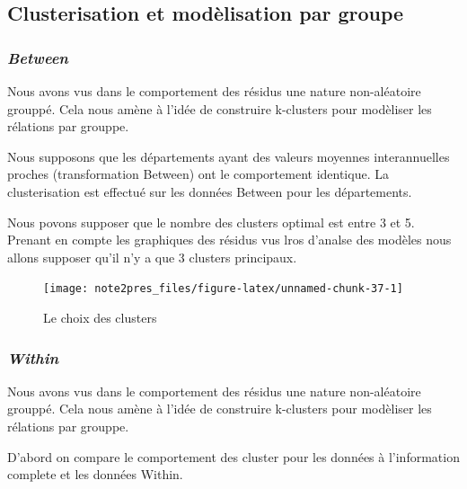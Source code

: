 \documentclass[11pt,]{article}
\begin{document}
\FloatBarrier

\hypertarget{clusterisation-et-modelisation-par-groupe}{%
\subsection{Clusterisation et modèlisation par
groupe}\label{clusterisation-et-modelisation-par-groupe}}

\hypertarget{between}{%
\subsubsection{\texorpdfstring{\emph{Between}}{Between}}\label{between}}

Nous avons vus dans le comportement des résidus une nature non-aléatoire
grouppé. Cela nous amène à l'idée de construire k-clusters pour
modèliser les rélations par grouppe.

Nous supposons que les départements ayant des valeurs moyennes
interannuelles proches (transformation Between) ont le comportement
identique. La clusterisation est effectué sur les données Between pour
les départements.

Nous povons supposer que le nombre des clusters optimal est entre 3 et
5. Prenant en compte les graphiques des résidus vus lros d'analse des
modèles nous allons supposer qu'il n'y a que 3 clusters principaux.

\FloatBarrier

\begin{figure}[!htbp]

{\centering \texttt{[image: note2pres\_files/figure-latex/unnamed-chunk-37-1]} 

}

\caption{Le choix des clusters}\label{fig:unnamed-chunk-37}
\end{figure}

\FloatBarrier

\hypertarget{within}{%
\subsubsection{\texorpdfstring{\emph{Within}}{Within}}\label{within}}

Nous avons vus dans le comportement des résidus une nature non-aléatoire
grouppé. Cela nous amène à l'idée de construire k-clusters pour
modèliser les rélations par grouppe.

D'abord on compare le comportement des cluster pour les données à
l'information complete et les données Within.
\end{document}

